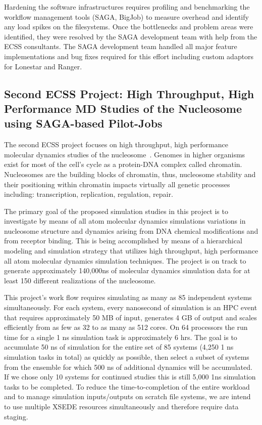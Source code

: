 \documentclass{sig-alternate}
\begin{document}
Hardening the software infrastructures requires profiling and benchmarking the
workflow management tools (SAGA, BigJob) to measure overhead and identify any
load spikes on the filesystems. Once the bottlenecks and problem areas were
identified, they were resolved by the SAGA development team with help from
the ECSS consultants. The SAGA development team handled all major feature
implementations and bug fixes required for this effort including custom
adaptors for Lonestar and Ranger. 

\subsection{Second ECSS Project: High Throughput, High Performance MD Studies of the Nucleosome
using SAGA-based Pilot-Jobs}
The second ECSS project focuses on high throughput, high performance molecular
dynamics studies of the nucleosome~\cite{TomBishop}. Genomes in higher organisms
exist for most of the cell's cycle as a protein-DNA complex called chromatin.
Nucleosomes are the building blocks of chromatin, thus, nucleosome stability and
their positioning within chromatin impacts virtually all genetic processes
including: transcription, replication, regulation, repair.

The primary goal of the proposed simulation studies in this project is to
investigate by means of all atom molecular dynamics simulations variations in
nucleosome structure and dynamics arising from DNA chemical modifications and
from receptor binding. This is being accomplished by means of a hierarchical
modeling and simulation strategy that utilizes high throughput, high
performance all atom molecular dynamics simulation techniques. The project is
on track to generate approximately 140,000ns of molecular dynamics simulation
data for at least 150 different realizations of the nucleosome.

This project's work flow requires simulating as many as 85 independent systems
simultaneously. For each system, every nanosecond of simulation is an HPC event
that requires approximately 50 MB of input, generates 4 GB of output and scales
efficiently from as few as 32 to as many as 512 cores. On 64 processors the run
time for a single 1 ns simulation task is approximately 6 hrs. The goal is to
accumulate 50 ns of simulation for the entire set of 85 systems (4,250 1 ns
simulation tasks in total) as quickly as possible, then select a subset of
systems from the ensemble for which 500 ns of additional dynamics will be
accumulated. If we chose only 10 systems for continued studies this is still
5,000 1ns simulation tasks to be completed. To reduce the time-to-completion of
the entire workload and to manage simulation inputs/outputs on scratch file
systems, we are intend to use multiple XSEDE resources simultaneously and
therefore require data staging.
\end{document}
